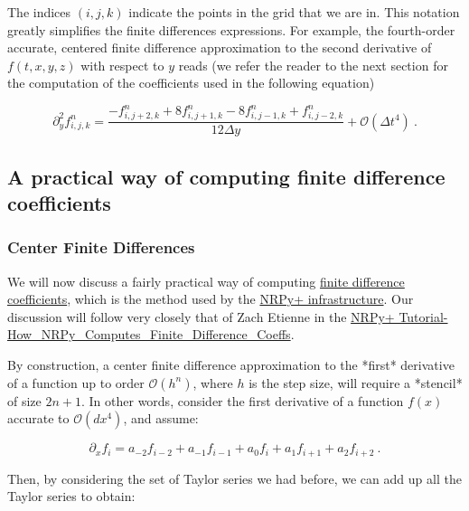 \documentclass[a4paper,11pt]{article}
\begin{document}
The indices $\left(i,j,k\right)$ indicate the points in the grid that we are in. This notation greatly simplifies the finite differences expressions. For example, the fourth-order accurate, centered finite difference approximation to the second derivative of $f(t,x,y,z)$ with respect to $y$ reads (we refer the reader to the next section for the computation of the coefficients used in the following equation)

\begin{equation}
\partial_{y}^{2}f^{n}_{i,j,k} = \frac{-f^{n}_{i,j+2,k}+8f^{n}_{i,j+1,k}-8f^{n}_{i,j-1,k}+f^{n}_{i,j-2,k}}{12\Delta y} + \mathcal{O}\left(\Delta t^{4}\right)\ .
\end{equation}

\subsection{A practical way of computing finite difference coefficients}

\subsubsection{Center Finite Differences}

We will now discuss a fairly practical way of computing \href{https://en.wikipedia.org/wiki/Finite_difference_coefficient}{finite difference coefficients}, which is the method used by the \href{https://blackholesathome.net/}{NRPy+ infrastructure}. Our discussion will follow very closely that of Zach Etienne in the \href{https://github.com/zachetienne/nrpytutorial/blob/master/Tutorial-How\_NRPy\_Computes\_Finite\_Difference\_Coeffs.ipynb}{NRPy+ Tutorial-How\_NRPy\_Computes\_Finite\_Difference\_Coeffs}.

By construction, a center finite difference approximation to the *first* derivative of a function up to order $\mathcal{O}\left(h^{n}\right)$, where $h$ is the step size, will require a *stencil* of size $2n+1$. In other words, consider the first derivative of a function $f(x)$ accurate to $\mathcal{O}\left(dx^{4}\right)$, and assume:

\begin{equation}
\partial_{x}f_{i} = a_{-2}f_{i-2} + a_{-1}f_{i-1} + a_{0}f_{i} + a_{1}f_{i+1} + a_{2}f_{i+2}\ .
\end{equation}

Then, by considering the set of Taylor series we had before, we can add up all the Taylor series to obtain:
\end{document}
